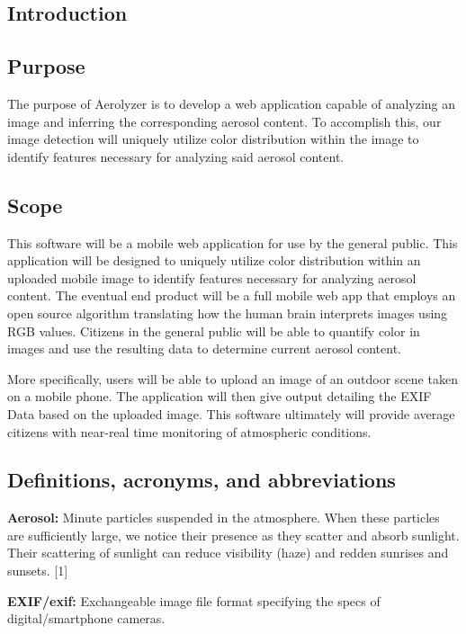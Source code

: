 \documentclass[letterpaper,10pt,draftclsnofoot,onecolumn]{IEEEtran}
\begin{document}
\begin{flushleft}
\clearpage
\tableofcontents
\clearpage

\section{Introduction}
\subsection{Purpose}
 The purpose of Aerolyzer is to develop a web application capable of analyzing an image
 and inferring the corresponding aerosol content. To accomplish this, our image detection
 will uniquely utilize color distribution within the image to identify features necessary for
 analyzing said aerosol content.

\subsection{Scope}
This software will be a mobile web application for use by the general public.
This application will be designed to uniquely utilize color distribution within an uploaded mobile image to identify features necessary for analyzing aerosol content.
The eventual end product will be a full mobile web app that employs an open source algorithm translating how the human brain interprets images using RGB values.
Citizens in the general public will be able to quantify color in images and use the resulting data to determine current aerosol content.

More specifically, users will be able to upload an image of an outdoor scene taken on a mobile phone.
The application will then give output detailing the EXIF Data based on the uploaded image.
This software ultimately will provide average citizens with near-real time monitoring of atmospheric conditions.

\subsection{Definitions, acronyms, and abbreviations}
\textbf{Aerosol: }Minute particles suspended in the atmosphere.
When these particles are sufficiently large, we notice their presence as they scatter and absorb sunlight.
Their scattering of sunlight can reduce visibility (haze) and redden sunrises and sunsets. [1]

\textbf{EXIF/exif: }Exchangeable image file format specifying the specs of digital/smartphone cameras.


\end{flushleft}
\end{document}
